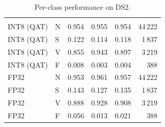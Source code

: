 \begin{table}[H]
  \centering
  \caption{Per-class performance on DS2.}
  \label{tab:per-class}
  \begin{tabularx}{\linewidth}{llRRRR}
     &  &  &  &  &  \\
    INT8 (QAT) & N & 0.954 & 0.955 & 0.954 & 44\,222 \\
    INT8 (QAT) & S & 0.122 & 0.114 & 0.118 & 1\,837 \\
    INT8 (QAT) & V & 0.855 & 0.943 & 0.897 & 3\,219 \\
    INT8 (QAT) & F & 0.008 & 0.003 & 0.004 & 388 \\
    FP32 & N & 0.953 & 0.961 & 0.957 & 44\,222 \\
    FP32 & S & 0.143 & 0.127 & 0.135 & 1\,837 \\
    FP32 & V & 0.888 & 0.928 & 0.908 & 3\,219 \\
    FP32 & F & 0.056 & 0.013 & 0.021 & 388 \\
    \bottomrule
  \end{tabularx}
\end{table}
